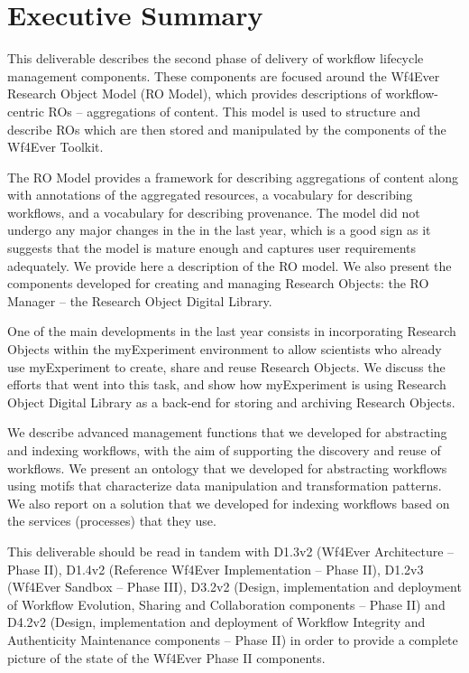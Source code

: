 \documentclass[a4paper, twoside, 11pt]{article}
\begin{document}
\section*{Executive Summary}
This deliverable describes the second phase of delivery of workflow
lifecycle management components. These components are focused around
the Wf4Ever Research Object Model (RO Model), which provides
descriptions of workflow-centric ROs -- aggregations of content. This
model is used to structure and describe ROs which are then stored and
manipulated by the components of the Wf4Ever Toolkit.

The RO Model provides a framework for describing aggregations of
content along with annotations of the aggregated resources, a
vocabulary for describing workflows, and a vocabulary for describing
provenance. The model did not undergo any major changes in the in the last year, which is a good sign as it suggests that the model is mature enough and captures user requirements adequately. 
We provide here a description of the RO model.
We also present the components developed for creating and managing Research Objects: the
RO Manager -- the
Research Object Digital Library. 


One of the main developments in the last year consists in incorporating Research Objects within the myExperiment environment to allow scientists who already use myExperiment to create, share and reuse Research Objects. We discuss the efforts that went into this task, and show how myExperiment is using Research Object Digital Library as a back-end for storing and archiving Research Objects.

We  describe advanced management functions that we developed for abstracting and indexing workflows, with the aim of supporting the discovery and reuse of workflows. We present an ontology that we developed for abstracting workflows using motifs that characterize data manipulation and transformation patterns. We also report on a solution that we developed for indexing workflows based on the services (processes) that they use.

This deliverable should be read in tandem with D1.3v2 (Wf4Ever
Architecture -- Phase II), D1.4v2 (Reference Wf4Ever Implementation --
Phase II), D1.2v3 (Wf4Ever Sandbox -- Phase III), D3.2v2 (Design,
implementation and deployment of Workflow Evolution, Sharing and
Collaboration components -- Phase II) and D4.2v2 (Design,
implementation and deployment of Workflow Integrity and Authenticity
Maintenance components -- Phase II) in order to provide a complete
picture of the state of the Wf4Ever Phase II components.
\end{document}

